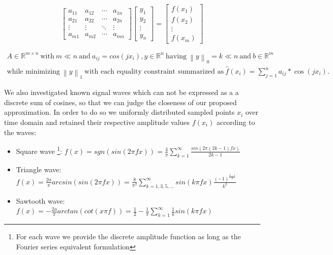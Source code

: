\documentclass[journal,article,submit,electronics,pdftex]{Definitions/mdpi}
\newcommand{\norm}[1]{\left\lVert#1\right\rVert}
\begin{document}
\[
\begin{bmatrix}
a_{11} & a_{12} & \cdots & a_{1n}\\
a_{21} & a_{22} & \cdots & a_{2n}\\
\vdots & \vdots & \ddots & \vdots\\
a_{m1} & a_{m2} & \cdots & a_{mn}
\end{bmatrix}
\begin{bmatrix}
y_1\\y_2\\ \vdots\\y_n
\end{bmatrix}
=\begin{bmatrix}
f(x_1)\\f(x_2)\\ \vdots\\f(x_m)
\end{bmatrix}
\]

\begin{equation}
\begin{array}{l}
A \in \mathbb{R}^{m \times n}\:\text{with}\:m \ll n\:\text{and}\:a_{ij} = cos(jx_i),
y \in \mathbb{R}^n\:\text{having}\:\norm{y}_0 = k \ll n\:\text{and}\:b \in \mathbb{R}^m\\
\text{while minimizing}\: \norm{y}_1\:\text{with each equality constraint summarized as}\:\hat{f}(x_i) = \sum\limits_{j=1}^n  a_{ij} * \cos(jx_i).
\end{array}
\end{equation}

We also investigated known signal waves which can not be expressed as a a discrete sum of cosines, so that we can judge the closeness of our proposed approximation. In order to do so we uniformly distributed sampled points $x_i$ over time domain and retained their respective amplitude values $f(x_i)$ according to the waves:

\begin{itemize}[leftmargin=*,labelsep=5.8mm]
\item Square wave \footnote[1]{For each wave we provide the discrete amplitude function as long as the Fourier series equivalent formulation}: $f(x) = sgn(sin(2\pi fx)) = 
\frac{4}{\pi}\sum\limits_{k=1}^{\infty}{\frac{sin(2\pi(2k - 1)fx)}{2k-1}}$ 
\item Triangle wave: $f(x) = \frac{2a}{\pi}arcsin(sin(2\pi fx)) = 
\frac{8}{\pi^2}\sum\limits_{k=1,3,5,...}^{\infty}{sin(k\pi fx)
\frac{(-1)^{\frac{k-1}{2}}}{k^2}}$
\item Sawtooth wave: $f(x) = -\frac{2a}{\pi}arctan(cot(x\pi f)) = \frac{1}{2}-\frac{1}{\pi}\sum\limits_{k=1}^{\infty}\frac{1}{k}sin(k\pi f x)$
\end{itemize}
\end{document}
